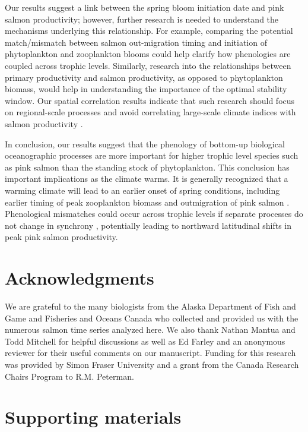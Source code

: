Our results suggest a link between the spring bloom initiation date and pink
salmon productivity; however, further research is needed to understand the
mechanisms underlying this relationship. For example, comparing the potential
match/mismatch between salmon out-migration timing and initiation of
phytoplankton and zooplankton blooms could help clarify how phenologies are
coupled across trophic levels. Similarly, research into the relationships
between primary productivity and salmon productivity, as opposed to
phytoplankton biomass, would help in understanding the importance of the optimal
stability window. Our spatial correlation results indicate that such research
should focus on regional-scale processes and avoid correlating large-scale
climate indices with salmon productivity \citep{Mueter2002a, Peterman2012}.

In conclusion, our results suggest that the phenology of bottom-up biological
oceanographic processes are more important for higher trophic level species such
as pink salmon than the standing stock of phytoplankton. This conclusion has
important implications as the climate warms. It is generally recognized that a
warming climate will lead to an earlier onset of spring conditions, including
earlier timing of peak zooplankton biomass and outmigration of pink salmon
\citep{Parmesan2003, Taylor2008a, Mackas2012}. Phenological mismatches could
occur across trophic levels if separate processes do not change in synchrony
\citep{Edwards2004a}, potentially leading to northward latitudinal shifts in
peak pink salmon productivity.



\section{Acknowledgments}

We are grateful to the many biologists from the Alaska Department of Fish and
Game and Fisheries and Oceans Canada who collected and provided us with the
numerous salmon time series analyzed here. We also thank Nathan Mantua and Todd
Mitchell for helpful discussions as well as Ed Farley and an anonymous reviewer
for their useful comments on our manuscript. Funding for this research was
provided by Simon Fraser University and a grant from the Canada Research Chairs
Program to R.M. Peterman.



\section{Supporting materials}

